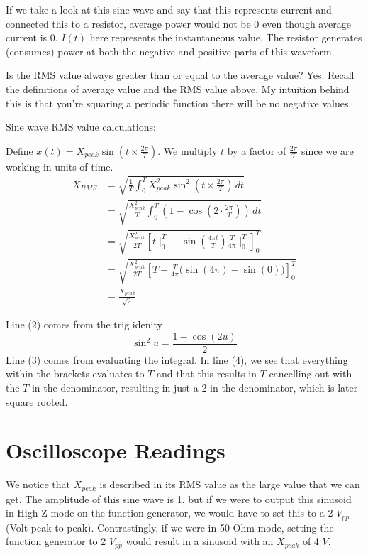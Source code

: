 If we take a look at this sine wave and say that this represents current and connected this to a resistor, average power would not be 0 even though average current is 0. $I(t)$ here represents the instantaneous value. The resistor generates (consumes) power at both the negative and positive parts of this waveform.



\begin{sanity}
    Is the RMS value always greater than or equal to the average value? Yes. Recall the definitions of average value and the RMS value above. My intuition behind this is that you're squaring a periodic function there will be no negative values.
\end{sanity}

Sine wave RMS value calculations:

Define $x(t) = X_{peak} \sin{(t \times \frac{2\pi}{T})}$. We multiply $t$ by a factor of $\frac{2\pi}{T}$ since we are working in units of time.
\begin{align*} 
    X_{RMS} &= \sqrt{\frac{1}{T} \int_0^T X_{peak}^2 \sin^2{(t \times \frac{2\pi}{T})} \,dt} \tag{1} \\
    &= \sqrt{\frac{X_{peak}^2}{T} \int_0^T (1-\cos{(2\cdot \frac{2\pi}{T})}) \,dt} \tag{2} \\
    &= \sqrt{\frac{X_{peak}^2}{2T} \left[t \mid_0^T - \sin{(\frac{4\pi t}{T})\frac{T}{4\pi} \mid_0^T}\right]_0^T} \tag{3} \\ 
    &= \sqrt{\frac{X_{peak}^2}{2T} \left[T - \frac{T}{4\pi}(\sin{(4\pi) - \sin{(0))}}\right]_0^T} \tag{4} \\
    &= \frac{X_{peak}}{\sqrt{2}} \tag{5}
\end{align*}

Line (2) comes from the trig idenity 
    \[\sin^2{u} = \frac{1-\cos{(2u)}}{2}\]
Line (3) comes from evaluating the integral. In line (4), we see that everything within the brackets evaluates to $T$ and that this results in $T$ cancelling out with the $T$ in the denominator, resulting in just a 2 in the denominator, which is later square rooted.

\section{Oscilloscope Readings}
We notice that $X_{peak}$ is described in its RMS value as the large value that we can get. The amplitude of this sine wave is 1, but if we were to output this sinusoid in High-Z mode on the function generator, we would have to set this to a 2 $V_{pp}$ (Volt peak to peak). Contrastingly, if we were in 50-Ohm mode, setting the function generator to 2 $V_{pp}$ would result in a sinusoid with an $X_{peak}$ of 4 $V$.

